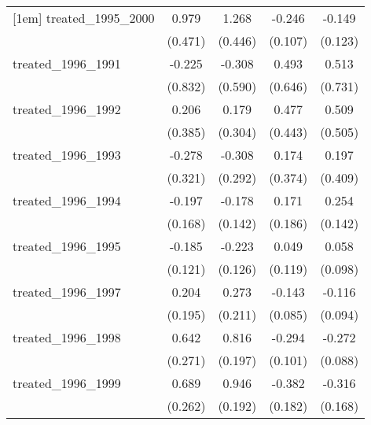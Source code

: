 {\begin{tabular}{l*{4}{c}}
[1em]
treated\_1995\_2000&       0.979\sym{*}  &       1.268\sym{**} &      -0.246\sym{*}  &      -0.149         \\
            &     (0.471)         &     (0.446)         &     (0.107)         &     (0.123)         \\
[1em]
treated\_1996\_1991&      -0.225         &      -0.308         &       0.493         &       0.513         \\
            &     (0.832)         &     (0.590)         &     (0.646)         &     (0.731)         \\
[1em]
treated\_1996\_1992&       0.206         &       0.179         &       0.477         &       0.509         \\
            &     (0.385)         &     (0.304)         &     (0.443)         &     (0.505)         \\
[1em]
treated\_1996\_1993&      -0.278         &      -0.308         &       0.174         &       0.197         \\
            &     (0.321)         &     (0.292)         &     (0.374)         &     (0.409)         \\
[1em]
treated\_1996\_1994&      -0.197         &      -0.178         &       0.171         &       0.254         \\
            &     (0.168)         &     (0.142)         &     (0.186)         &     (0.142)         \\
[1em]
treated\_1996\_1995&      -0.185         &      -0.223         &       0.049         &       0.058         \\
            &     (0.121)         &     (0.126)         &     (0.119)         &     (0.098)         \\
[1em]
treated\_1996\_1997&       0.204         &       0.273         &      -0.143         &      -0.116         \\
            &     (0.195)         &     (0.211)         &     (0.085)         &     (0.094)         \\
[1em]
treated\_1996\_1998&       0.642\sym{*}  &       0.816\sym{***}&      -0.294\sym{**} &      -0.272\sym{**} \\
            &     (0.271)         &     (0.197)         &     (0.101)         &     (0.088)         \\
[1em]
treated\_1996\_1999&       0.689\sym{**} &       0.946\sym{***}&      -0.382\sym{*}  &      -0.316         \\
            &     (0.262)         &     (0.192)         &     (0.182)         &     (0.168)         \\

\end{tabular}}
